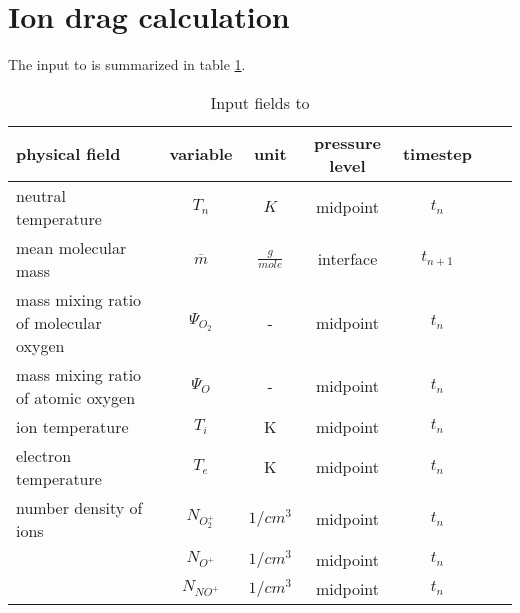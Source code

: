 %
\section{Ion drag calculation  }\label{cap:lamdas}
%
The input to  is summarized in table
\ref{tab:input_lamdas}.
%
\begin{table}[tb]
\begin{tabular}{|p{3.5cm} ||c|c|c|c|c|c|} \hline
physical field               & variable        & unit&pressure
level& timestep
\\ \hline \hline
%
neutral temperature         & $T_n$           & $K$   & midpoint  & $t_n$\\
mean molecular mass         & $\overline{m}$  & $\frac{g}{mole}$ &interface & $t_{n+1}$ \\
mass mixing ratio of molecular oxygen             & $\Psi_{O_2}$        & -  & midpoint & $t_n$\\
mass mixing ratio of atomic oxygen                & $\Psi_{O}$          & -  & midpoint & $t_n$\\
ion temperature              & $T_i$        & K  & midpoint & $t_n$\\
electron temperature         & $T_e$        & K  & midpoint & $t_n$\\
number density of ions       &  $N_{O_2^+}$      & $1/cm^3$  & midpoint & $t_n$\\
  {}       &  $N_{O^+}$      & $1/cm^3$  & midpoint & $t_n$\\
 {}        &  $N_{NO^+}$     & $1/cm^3$  & midpoint & $t_n$
 \\ \hline
\end{tabular}
\caption{Input fields to }
\label{tab:input_lamdas}
\end{table}

